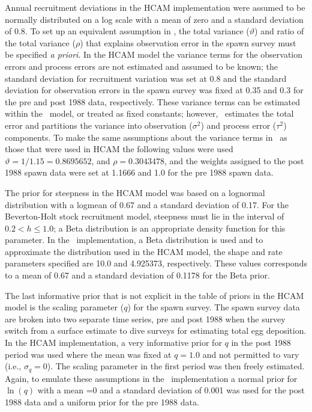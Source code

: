Annual recruitment deviations in the HCAM implementation were assumed to be normally distributed on a log scale with a mean of zero and a standard deviation of 0.8.  To set up an equivalent assumption in \iscam, the total variance ($\vartheta$) and ratio of the total variance ($\rho$) that explains observation error in the spawn survey must be specified \emph{a priori}. In the HCAM model the variance terms for the observation errors and process errors are not estimated and assumed to be known; the standard deviation for recruitment variation was set at 0.8 and the standard deviation for observation errors in the spawn survey was fixed at 0.35 and 0.3 for the pre and post 1988 data, respectively.  These variance terms can be estimated within the \iscam\ model, or treated as fixed constants; however, \iscam\ estimates the total error and partitions the variance into observation ($\sigma^2$) and process error ($\tau^2$) components.  To make the same assumptions about the variance terms in \iscam\ as those that were used in HCAM the following values were used $\vartheta=1/1.15=0.8695652$, and $\rho=0.3043478$, and the weights assigned to the post 1988 spawn data were set at 1.1666 and 1.0 for the pre 1988 spawn data.

The prior for steepness in the HCAM model was based on a lognormal distribution with a logmean of 0.67 and a standard deviation of 0.17.  For the Beverton-Holt stock recruitment model, steepness must lie in the interval of  $0.2<h\leq1.0$; a Beta distribution is an appropriate density function for this parameter. In the \iscam\ implementation, a Beta distribution is used and to approximate the distribution used in the HCAM model, the shape and rate parameters specified are 10.0 and 4.925373, respectively.  These values corresponds to a mean of 0.67 and a standard deviation of 0.1178 for the Beta prior.

The last informative prior that is not explicit in the table of priors in the HCAM model is the scaling parameter ($q$) for the spawn survey.  The spawn survey data are broken into two separate time series, pre and post 1988 when the survey switch from a surface estimate to dive surveys for estimating total egg deposition.  In the HCAM implementation, a very informative prior for $q$ in the post 1988 period was used where the mean was fixed at $q=1.0$ and not permitted to vary (i.e., $\sigma_q=0$).  The scaling parameter in the first period was then freely estimated. Again, to emulate these assumptions in the \iscam\ implementation a normal prior for $\ln(q)$ with a mean =0 and a standard deviation of 0.001 was used for the post 1988 data and a uniform prior for the pre 1988 data.

